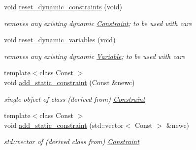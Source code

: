 \begin{Indent}
\begin{DoxyCompactItemize}
void \mbox{\hyperlink{class_s_m_spp__di__unipi__it_1_1_block_a92e3c32bebdfb05e119f05f1030dc11a}{reset\+\_\+dynamic\+\_\+constraints}} (void)
\begin{DoxyCompactList}\small\item\em removes any existing dynamic \mbox{\hyperlink{class_s_m_spp__di__unipi__it_1_1_constraint}{Constraint}}; to be used with care \end{DoxyCompactList}\item 
\mbox{\label{class_s_m_spp__di__unipi__it_1_1_block_af4d189bd9f575982762f4841909d3797}} 
void \mbox{\hyperlink{class_s_m_spp__di__unipi__it_1_1_block_af4d189bd9f575982762f4841909d3797}{reset\+\_\+dynamic\+\_\+variables}} (void)
\begin{DoxyCompactList}\small\item\em removes any existing dynamic \mbox{\hyperlink{class_s_m_spp__di__unipi__it_1_1_variable}{Variable}}; to be used with care \end{DoxyCompactList}\item 
\mbox{\label{class_s_m_spp__di__unipi__it_1_1_block_a05ed7d7c9380f9476d53192bd2e4361d}} 
{\footnotesize template$<$class Const $>$ }\\void \mbox{\hyperlink{class_s_m_spp__di__unipi__it_1_1_block_a05ed7d7c9380f9476d53192bd2e4361d}{add\+\_\+static\+\_\+constraint}} (Const \&newc)
\begin{DoxyCompactList}\small\item\em single object of class (derived from) \mbox{\hyperlink{class_s_m_spp__di__unipi__it_1_1_constraint}{Constraint}} \end{DoxyCompactList}\item 
\mbox{\label{class_s_m_spp__di__unipi__it_1_1_block_a1bda7affebe9833cbb1df94e8316609a}} 
{\footnotesize template$<$class Const $>$ }\\void \mbox{\hyperlink{class_s_m_spp__di__unipi__it_1_1_block_a1bda7affebe9833cbb1df94e8316609a}{add\+\_\+static\+\_\+constraint}} (std\+::vector$<$ Const $>$ \&newc)
\begin{DoxyCompactList}\small\item\em std\+::vector of (derived class from) \mbox{\hyperlink{class_s_m_spp__di__unipi__it_1_1_constraint}{Constraint}} \end{DoxyCompactList}\item 

\end{DoxyCompactItemize}
\end{Indent}
